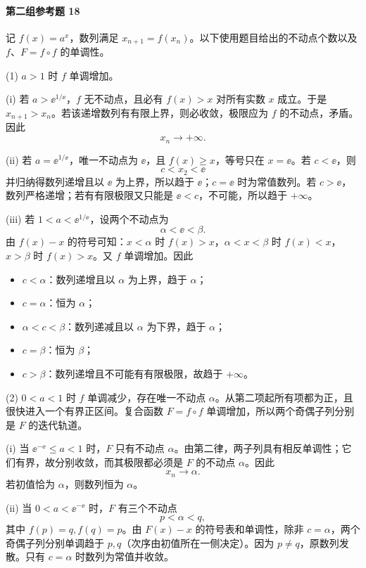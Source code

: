 \paragraph{第二组参考题 18}
\begin{xsolution}
记 $f(x)=a^x$，数列满足 $x_{n+1}=f(x_n)$。以下使用题目给出的不动点个数以及 $f$、$F=f\circ f$ 的单调性。

(1) $a>1$ 时 $f$ 单调增加。

(i) 若 $a>\ee^{1/\ee}$，$f$ 无不动点，且必有 $f(x)>x$ 对所有实数 $x$ 成立。于是 $x_{n+1}>x_n$。若该递增数列有有限上界，则必收敛，极限应为 $f$ 的不动点，矛盾。因此
\[
  x_n\to+\infty.
\]

(ii) 若 $a=\ee^{1/\ee}$，唯一不动点为 $\ee$，且 $f(x)\ge x$，等号只在 $x=\ee$。若 $c<\ee$，则
\[
  c<x_2<\ee
\]
并归纳得数列递增且以 $\ee$ 为上界，所以趋于 $\ee$；$c=\ee$ 时为常值数列。若 $c>\ee$，数列严格递增；若有有限极限又只能是 $\ee<c$，不可能，所以趋于 $+\infty$。

(iii) 若 $1<a<\ee^{1/\ee}$，设两个不动点为
\[
  \alpha<\ee<\beta.
\]
由 $f(x)-x$ 的符号可知：$x<\alpha$ 时 $f(x)>x$，$\alpha<x<\beta$ 时 $f(x)<x$，$x>\beta$ 时 $f(x)>x$。又 $f$ 单调增加。因此
\begin{itemize}
  \item $c<\alpha$：数列递增且以 $\alpha$ 为上界，趋于 $\alpha$；
  \item $c=\alpha$：恒为 $\alpha$；
  \item $\alpha<c<\beta$：数列递减且以 $\alpha$ 为下界，趋于 $\alpha$；
  \item $c=\beta$：恒为 $\beta$；
  \item $c>\beta$：数列递增且不可能有有限极限，故趋于 $+\infty$。
\end{itemize}

(2) $0<a<1$ 时 $f$ 单调减少，存在唯一不动点 $\alpha$。从第二项起所有项都为正，且很快进入一个有界正区间。复合函数 $F=f\circ f$ 单调增加，所以两个奇偶子列分别是 $F$ 的迭代轨道。

(i) 当 $\ee^{-\ee}\le a<1$ 时，$F$ 只有不动点 $\alpha$。由第二律，两子列具有相反单调性；它们有界，故分别收敛，而其极限都必须是 $F$ 的不动点 $\alpha$。因此
\[
  \boxed{x_n\to\alpha}.
\]
若初值恰为 $\alpha$，则数列恒为 $\alpha$。

(ii) 当 $0<a<\ee^{-\ee}$ 时，$F$ 有三个不动点
\[
  p<\alpha<q,
\]
其中 $f(p)=q,f(q)=p$。由 $F(x)-x$ 的符号表和单调性，除非 $c=\alpha$，两个奇偶子列分别单调趋于 $p,q$（次序由初值所在一侧决定）。因为 $p\ne q$，原数列发散。只有 $c=\alpha$ 时数列为常值并收敛。
\end{xsolution}

